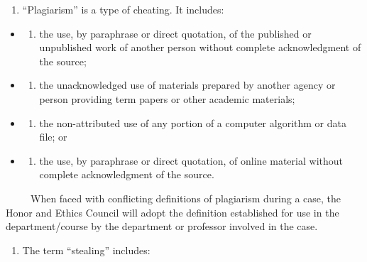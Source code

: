 \begin{enumerate}
\def\labelenumi{\arabic{enumi}.}
\setcounter{enumi}{1}
\tightlist
\item
  ``Plagiarism'' is a type of cheating. It includes:
\end{enumerate}

\begin{itemize}
\item
  \begin{enumerate}
  \def\labelenumi{(\alph{enumi})}
  \tightlist
  \item
    the use, by paraphrase or direct quotation, of the published or unpublished work of another person without complete acknowledgment of the source;
  \end{enumerate}
\item
  \begin{enumerate}
  \def\labelenumi{(\alph{enumi})}
  \setcounter{enumi}{1}
  \tightlist
  \item
    the unacknowledged use of materials prepared by another agency or person providing term papers or other academic materials;
  \end{enumerate}
\item
  \begin{enumerate}
  \def\labelenumi{(\alph{enumi})}
  \setcounter{enumi}{2}
  \tightlist
  \item
    the non-attributed use of any portion of a computer algorithm or data file; or
  \end{enumerate}
\item
  \begin{enumerate}
  \def\labelenumi{(\alph{enumi})}
  \setcounter{enumi}{3}
  \tightlist
  \item
    the use, by paraphrase or direct quotation, of online material without complete acknowledgment of the source.
  \end{enumerate}
\end{itemize}

~~~~~When faced with conflicting definitions of plagiarism during a case, the Honor and Ethics Council will adopt the definition established for use in the department/course by the department or professor involved in the case.

\begin{enumerate}
\def\labelenumi{\arabic{enumi}.}
\setcounter{enumi}{2}
\tightlist
\item
  The term ``stealing'' includes:
\end{enumerate}

